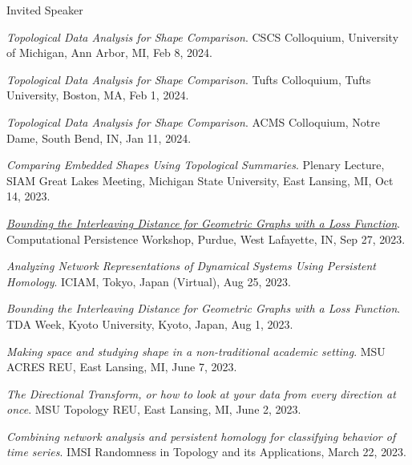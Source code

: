 \documentclass{resume} %
\begin{document}
%
\newpage
\begin{rSection}{Invited Speaker}

\begin{etaremune}
\item\emph{Topological Data Analysis for Shape Comparison}. CSCS Colloquium, University of Michigan, Ann Arbor, MI, Feb 8, 2024. 

\item\emph{Topological Data Analysis for Shape Comparison}. Tufts Colloquium, Tufts University, Boston, MA, Feb 1, 2024. 

\item\emph{Topological Data Analysis for Shape Comparison}. ACMS Colloquium, Notre Dame, South Bend, IN, Jan 11, 2024. 

\item\emph{Comparing Embedded Shapes Using Topological Summaries}. Plenary Lecture, SIAM Great Lakes Meeting, Michigan State University, East Lansing, MI, Oct 14, 2023. 

\item\emph{\href{https://youtu.be/PJBgBoowQA4}{Bounding the Interleaving Distance for Geometric Graphs with a Loss Function}}. Computational Persistence Workshop, Purdue, West Lafayette, IN, Sep 27, 2023. 

\item\emph{Analyzing Network Representations of Dynamical Systems Using Persistent Homology}. ICIAM, Tokyo, Japan (Virtual), Aug 25, 2023. 

\item\emph{Bounding the Interleaving Distance for Geometric Graphs with a Loss Function}. TDA Week, Kyoto University, Kyoto, Japan, Aug 1, 2023. 

\item\emph{Making space and studying shape in a non-traditional academic setting}. MSU ACRES REU, East Lansing, MI, June 7, 2023. 

\item\emph{The Directional Transform, or how to look at your data from every direction at once}. MSU Topology REU, East Lansing, MI, June 2, 2023. 

\item\emph{Combining network analysis and persistent homology for classifying behavior of time series}. IMSI Randomness in Topology and its Applications, March 22, 2023. 


\end{etaremune}
\end{rSection}
\end{document}
